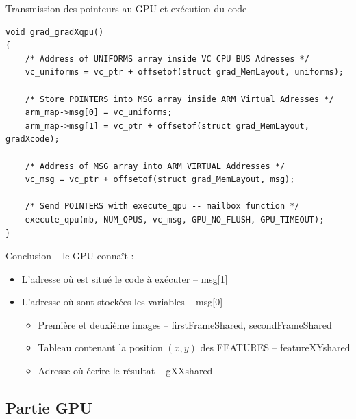 \documentclass{bredelebeamer}
\begin{document}
\begin{frame}[fragile]{Transmission des pointeurs au GPU et exécution du code}

\begin{lstlisting}
void grad_gradXqpu()
{
    /* Address of UNIFORMS array inside VC CPU BUS Adresses */
    vc_uniforms = vc_ptr + offsetof(struct grad_MemLayout, uniforms);

    /* Store POINTERS into MSG array inside ARM Virtual Adresses */
    arm_map->msg[0] = vc_uniforms;
    arm_map->msg[1] = vc_ptr + offsetof(struct grad_MemLayout, gradXcode);

    /* Address of MSG array into ARM VIRTUAL Addresses */
    vc_msg = vc_ptr + offsetof(struct grad_MemLayout, msg);

    /* Send POINTERS with execute_qpu -- mailbox function */
    execute_qpu(mb, NUM_QPUS, vc_msg, GPU_NO_FLUSH, GPU_TIMEOUT);
}
\end{lstlisting}

\begin{alertblock}{Conclusion -- le GPU conna\^it :}
\begin{itemize}
\item L'adresse où est situé le code à exécuter -- msg[1]
\item L'adresse où sont stockées les variables -- msg[0]
	\begin{itemize}
		\item Première et deuxième images -- firstFrameShared, secondFrameShared
		\item Tableau contenant la position $(x,y)$ des FEATURES -- featureXYshared
		\item Adresse où écrire le résultat -- gXXshared
	\end{itemize}
\end{itemize}
\end{alertblock}

\end{frame}



\subsection{Partie GPU}

\end{document}
